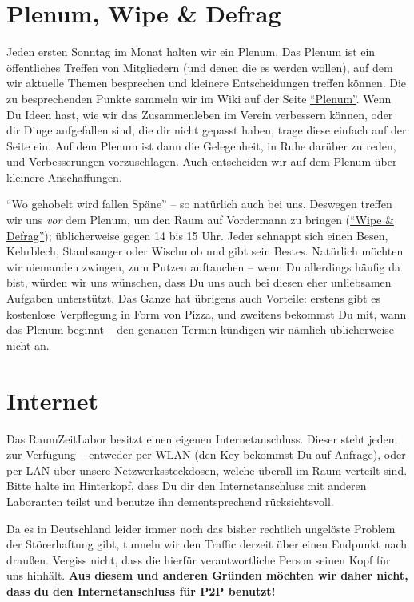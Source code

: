 \documentclass[12pt, DIV16, a4paper]{scrartcl}
\begin{document}
\section*{Plenum, Wipe \& Defrag}

Jeden ersten Sonntag im Monat halten wir ein Plenum. Das Plenum ist ein
öffentliches Treffen von Mitgliedern (und denen die es werden wollen), auf dem
wir aktuelle Themen besprechen und kleinere Entscheidungen treffen können. Die
zu besprechenden Punkte sammeln wir im Wiki auf der Seite
\href{https://wiki.raumzeitlabor.de/wiki/Plenum}{``Plenum''}. Wenn Du Ideen hast, wie
wir das Zusammenleben im Verein verbessern können, oder dir Dinge aufgefallen
sind, die dir nicht gepasst haben, trage diese einfach auf der Seite ein. Auf
dem Plenum ist dann die Gelegenheit, in Ruhe darüber zu reden, und
Verbesserungen vorzuschlagen. Auch entscheiden wir auf dem Plenum über kleinere
Anschaffungen. \np

``Wo gehobelt wird fallen Späne'' -- so natürlich auch bei uns. Deswegen treffen
wir uns \emph{vor} dem Plenum, um den Raum auf Vordermann zu bringen
(\href{https://wiki.raumzeitlabor.de/wiki/Wipe_\%26_Defrag}{``Wipe \& Defrag''});
üblicherweise gegen 14 bis 15 Uhr. Jeder schnappt sich einen Besen, Kehrblech,
Staubsauger oder Wischmob und gibt sein Bestes. Natürlich möchten wir niemanden
zwingen, zum Putzen auftauchen -- wenn Du allerdings häufig da bist, würden wir
uns wünschen, dass Du uns auch bei diesen eher unliebsamen Aufgaben unterstützt.
Das Ganze hat übrigens auch Vorteile: erstens gibt es kostenlose Verpflegung in
Form von Pizza, und zweitens bekommst Du mit, wann das Plenum beginnt -- den
genauen Termin kündigen wir nämlich üblicherweise nicht an.

\section*{Internet}

Das RaumZeitLabor besitzt einen eigenen Internetanschluss. Dieser steht jedem
zur Verfügung -- entweder per WLAN (den Key bekommst Du auf Anfrage), oder per
LAN über unsere Netzwerkssteckdosen, welche überall im Raum verteilt sind. Bitte
halte im Hinterkopf, dass Du dir den Internetanschluss mit anderen Laboranten
teilst und benutze ihn dementsprechend rücksichtsvoll.
\np

Da es in Deutschland leider immer noch das bisher rechtlich ungelöste Problem
der Störerhaftung gibt, tunneln wir den Traffic derzeit über einen Endpunkt nach
draußen. Vergiss nicht, dass die hierfür verantwortliche Person seinen Kopf für
uns hinhält. \textbf{Aus diesem und anderen Gründen möchten wir daher nicht,
dass du den Internetanschluss für P2P benutzt!}
\end{document}
